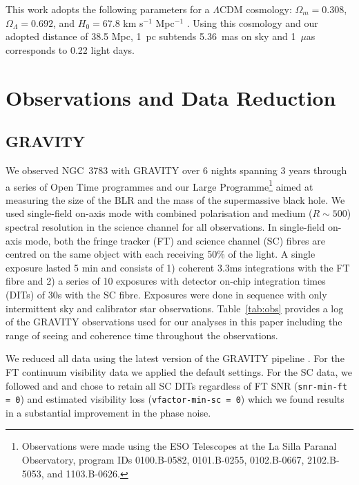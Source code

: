 \documentclass[longauth,]{aa}
\begin{document}
This work adopts the following parameters for a $\Lambda$CDM cosmology: 
$\Omega_m = 0.308$, $\Omega_\Lambda = 0.692$, 
and $H_{0}=67.8$ km s$^{-1}$ Mpc$^{-1}$ \citep{Planck2016AA}. Using this 
cosmology and our adopted distance of 38.5 Mpc, 1~pc subtends 5.36~mas on sky and 1~$\mu$as corresponds to 0.22 light days.

\section{Observations and Data Reduction}
\subsection{GRAVITY}
We observed NGC~3783 with GRAVITY \citep{GC2017FL} over 6 nights spanning 3 years through a series of Open Time programmes and our Large Programme\footnote{Observations were made using the ESO Telescopes at the 
La Silla Paranal Observatory, program IDs 0100.B-0582, 0101.B-0255, 0102.B-0667, 2102.B-5053, and 1103.B-0626.} aimed at measuring the size of the BLR and the mass of the supermassive black hole. We used single-field on-axis mode with combined polarisation and medium ($R\sim500$) spectral resolution in the science channel for all observations. In single-field on-axis mode, both the fringe tracker (FT) and science channel (SC) fibres are centred on the same object with each receiving 50\% of the light. A single exposure lasted 5 min and consists of 1) coherent 3.3ms integrations with the FT fibre and 2) a series of 10 exposures with detector on-chip integration times (DITs) of 30s with the SC fibre. Exposures were done in sequence with only intermittent sky and calibrator star observations.  Table~\ref{tab:obs} provides a log of the GRAVITY observations used for our analyses in this paper including the range of seeing and coherence time throughout the observations. 



We reduced all data using the latest version of the GRAVITY pipeline \citep{Lapeyrere2014SPIE}. For the FT continuum visibility data we applied the default settings. For the SC data, we followed \citet[][hereafter GC20a]{Gravity-Collaboration:2020ab} and \citet[][hereafter GC20b]{Gravity-Collaboration:2020ac} and chose to retain all SC DITs regardless of FT SNR (\texttt{snr-min-ft = 0}) and estimated visibility loss (\texttt{vfactor-min-sc = 0}) which we found results in a substantial improvement in the phase noise. 
\end{document}
